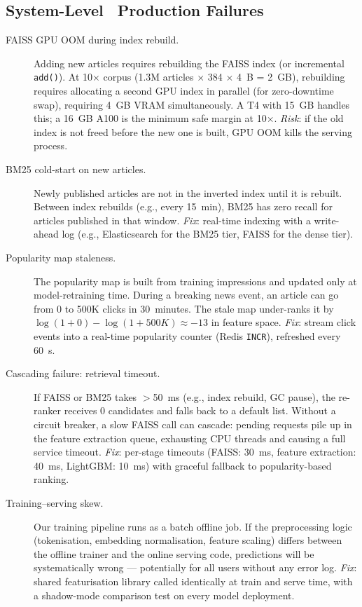 \documentclass[11pt,a4paper]{article}
\begin{document}
\subsection{System-Level \ Production Failures}

\begin{description}
  \item[FAISS GPU OOM during index rebuild.] Adding new articles requires
        rebuilding the FAISS index (or incremental \texttt{add()}). At 10$\times$
        corpus (1.3M articles $\times$ 384 $\times$ 4~B = 2~GB), rebuilding
        requires allocating a second GPU index in parallel (for zero-downtime
        swap), requiring 4~GB VRAM simultaneously. A T4 with 15~GB handles this;
        a 16~GB A100 is the minimum safe margin at 10$\times$. \emph{Risk}: if
        the old index is not freed before the new one is built, GPU OOM kills the
        serving process.

  \item[BM25 cold-start on new articles.] Newly published articles are not in
        the inverted index until it is rebuilt. Between index rebuilds (e.g.,
        every 15~min), BM25 has zero recall for articles published in that
        window. \emph{Fix}: real-time indexing with a write-ahead log
        (e.g., Elasticsearch for the BM25 tier, FAISS for the dense tier).

  \item[Popularity map staleness.] The popularity map is built from training
        impressions and updated only at model-retraining time. During a breaking
        news event, an article can go from 0 to 500K clicks in 30~minutes.
        The stale map under-ranks it by $\log(1+0) - \log(1+500K) \approx -13$
        in feature space. \emph{Fix}: stream click events into a real-time
        popularity counter (Redis \texttt{INCR}), refreshed every 60~s.

  \item[Cascading failure: retrieval timeout.] If FAISS or BM25 takes $>$50~ms
        (e.g., index rebuild, GC pause), the re-ranker receives 0 candidates
        and falls back to a default list. Without a circuit breaker, a slow
        FAISS call can cascade: pending requests pile up in the feature
        extraction queue, exhausting CPU threads and causing a full service
        timeout. \emph{Fix}: per-stage timeouts (FAISS: 30~ms, feature
        extraction: 40~ms, LightGBM: 10~ms) with graceful fallback to
        popularity-based ranking.

  \item[Training--serving skew.] Our training pipeline runs as a batch offline
        job. If the preprocessing logic (tokenisation, embedding
        normalisation, feature scaling) differs between the offline trainer and
        the online serving code, predictions will be systematically wrong ---
        potentially for all users without any error log. \emph{Fix}: shared
        featurisation library called identically at train and serve time,
        with a shadow-mode comparison test on every model deployment.
\end{description}
\end{document}
